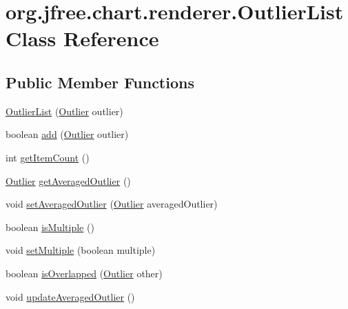 \hypertarget{classorg_1_1jfree_1_1chart_1_1renderer_1_1_outlier_list}{}\section{org.\+jfree.\+chart.\+renderer.\+Outlier\+List Class Reference}
\label{classorg_1_1jfree_1_1chart_1_1renderer_1_1_outlier_list}
\subsection*{Public Member Functions}
\begin{DoxyCompactItemize}
\item 
\mbox{\hyperlink{classorg_1_1jfree_1_1chart_1_1renderer_1_1_outlier_list_a595dce5346dc46d5efa84fbba235e157}{Outlier\+List}} (\mbox{\hyperlink{classorg_1_1jfree_1_1chart_1_1renderer_1_1_outlier}{Outlier}} outlier)
\item 
boolean \mbox{\hyperlink{classorg_1_1jfree_1_1chart_1_1renderer_1_1_outlier_list_a65bd496856ff8060a66cbe059294f07f}{add}} (\mbox{\hyperlink{classorg_1_1jfree_1_1chart_1_1renderer_1_1_outlier}{Outlier}} outlier)
\item 
int \mbox{\hyperlink{classorg_1_1jfree_1_1chart_1_1renderer_1_1_outlier_list_ae3017a62b7d0704a322cc14eed0c739c}{get\+Item\+Count}} ()
\item 
\mbox{\hyperlink{classorg_1_1jfree_1_1chart_1_1renderer_1_1_outlier}{Outlier}} \mbox{\hyperlink{classorg_1_1jfree_1_1chart_1_1renderer_1_1_outlier_list_a12276b247a7177a300937760e82a0d46}{get\+Averaged\+Outlier}} ()
\item 
void \mbox{\hyperlink{classorg_1_1jfree_1_1chart_1_1renderer_1_1_outlier_list_a1353a78e42c50e1306be7ac20f491ce8}{set\+Averaged\+Outlier}} (\mbox{\hyperlink{classorg_1_1jfree_1_1chart_1_1renderer_1_1_outlier}{Outlier}} averaged\+Outlier)
\item 
boolean \mbox{\hyperlink{classorg_1_1jfree_1_1chart_1_1renderer_1_1_outlier_list_aea765af5e62cfa1c14fd9bee0857c437}{is\+Multiple}} ()
\item 
void \mbox{\hyperlink{classorg_1_1jfree_1_1chart_1_1renderer_1_1_outlier_list_acd5a5b3f307747eaea2de955a89c295a}{set\+Multiple}} (boolean multiple)
\item 
boolean \mbox{\hyperlink{classorg_1_1jfree_1_1chart_1_1renderer_1_1_outlier_list_a156a0cd0c31f4ce86e25ea067c800903}{is\+Overlapped}} (\mbox{\hyperlink{classorg_1_1jfree_1_1chart_1_1renderer_1_1_outlier}{Outlier}} other)
\item 
void \mbox{\hyperlink{classorg_1_1jfree_1_1chart_1_1renderer_1_1_outlier_list_ac3a51c9fbe1368fa86bd142349960c1c}{update\+Averaged\+Outlier}} ()
\end{DoxyCompactItemize}


